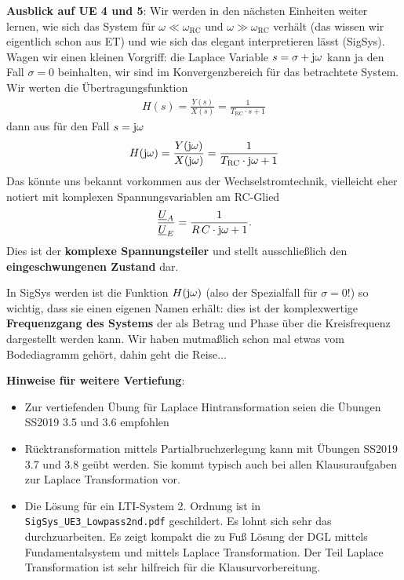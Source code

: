 \documentclass[11pt,a4paper,DIV=12]{scrartcl}
\numberwithin{equation}{section}
\numberwithin{figure}{section}
\begin{document}
\clearpage
\begin{mdframed}
\textbf{Ausblick auf UE 4 und 5}:
Wir werden in den nächsten Einheiten weiter lernen, wie sich das System
für $\omega\ll\omega_\mathrm{RC}$ und $\omega\gg\omega_\mathrm{RC}$
verhält (das wissen wir eigentlich schon aus ET) und wie sich das elegant
interpretieren lässt (SigSys).
Wagen wir einen kleinen Vorgriff: die Laplace Variable $s=\sigma + \im\omega$
kann ja den Fall $\sigma=0$ beinhalten, wir sind im Konvergenzbereich
für das betrachtete System. Wir werten die Übertragungsfunktion
\begin{align}
H(s) = \frac{Y(s)}{X(s)} = \frac{1}{T_\mathrm{RC} \cdot s + 1}
\end{align}
dann aus für den Fall $s=\im\omega$
\begin{align}
H(\im\omega) = \frac{Y(\im\omega)}{X(\im\omega)} =
\frac{1}{T_\mathrm{RC} \cdot \im\omega + 1}
\end{align}
Das könnte uns bekannt vorkommen aus der Wechselstromtechnik, vielleicht eher
notiert mit komplexen Spannungsvariablen am RC-Glied
\begin{align}
\frac{\underline{U}_A}{\underline{U}_E} =
\frac{1}{R\,C \cdot \im\omega + 1}.
\end{align}
Dies ist der \textbf{komplexe Spannungsteiler} und stellt
ausschließlich den \textbf{eingeschwungenen Zustand} dar.

In SigSys werden ist die Funktion $H(\im\omega)$ (also der Spezialfall
für $\sigma=0$!) so wichtig, dass sie einen eigenen Namen erhält: dies ist
der komplexwertige \textbf{Frequenzgang des Systems} der als Betrag und Phase
über die Kreisfrequenz dargestellt werden kann.
Wir haben mutmaßlich schon mal etwas vom Bodediagramm gehört, dahin geht die Reise...

\end{mdframed}

\textbf{Hinweise für weitere Vertiefung}:
\begin{itemize}
  \item Zur vertiefenden Übung für Laplace Hintransformation seien die Übungen SS2019 3.5 und 3.6 empfohlen
  \item Rücktransformation mittels Partialbruchzerlegung kann mit Übungen SS2019 3.7 und 3.8 geübt werden.
  Sie kommt typisch auch bei allen Klausuraufgaben zur Laplace Transformation vor.
  \item Die Lösung für ein LTI-System 2. Ordnung ist in
  \verb|SigSys_UE3_Lowpass2nd.pdf| geschildert. Es lohnt sich sehr das durchzuarbeiten.
 Es zeigt kompakt die zu Fuß Lösung der DGL mittels Fundamentalsystem und mittels Laplace Transformation.
 Der Teil Laplace Transformation ist sehr hilfreich für die Klausurvorbereitung.
\end{itemize}






%
\cite{*}
\clearpage

\end{document}
